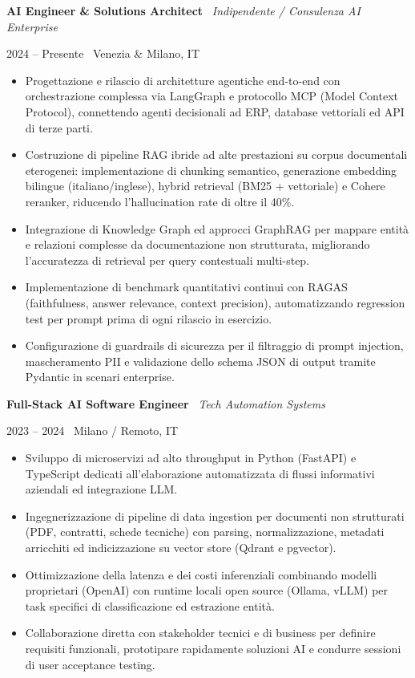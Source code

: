 \documentclass[a4paper,10pt]{article}
\newcommand{\role}[4]{%
  \vspace{2pt}\noindent
  \begin{minipage}[t]{0.70\textwidth}\raggedright\textbf{#1} \textbullet\ \textit{#3}\end{minipage}%
  \hfill
  \begin{minipage}[t]{0.28\textwidth}\raggedleft\footnotesize\color{gray}#2 \textbullet\ #4\end{minipage}%
  \vspace{1pt}%
}
\begin{document}
\role{AI Engineer \& Solutions Architect}{2024 -- Presente}{Indipendente / Consulenza AI Enterprise}{Venezia \& Milano, IT}
\begin{itemize}
  \item Progettazione e rilascio di architetture agentiche end-to-end con orchestrazione complessa via LangGraph e protocollo MCP (Model Context Protocol), connettendo agenti decisionali ad ERP, database vettoriali ed API di terze parti.
  \item Costruzione di pipeline RAG ibride ad alte prestazioni su corpus documentali eterogenei: implementazione di chunking semantico, generazione embedding bilingue (italiano/inglese), hybrid retrieval (BM25 + vettoriale) e Cohere reranker, riducendo l'hallucination rate di oltre il 40\%.
  \item Integrazione di Knowledge Graph ed approcci GraphRAG per mappare entità e relazioni complesse da documentazione non strutturata, migliorando l'accuratezza di retrieval per query contestuali multi-step.
  \item Implementazione di benchmark quantitativi continui con RAGAS (faithfulness, answer relevance, context precision), automatizzando regression test per prompt prima di ogni rilascio in esercizio.
  \item Configurazione di guardrails di sicurezza per il filtraggio di prompt injection, mascheramento PII e validazione dello schema JSON di output tramite Pydantic in scenari enterprise.
\end{itemize}

\vspace{3pt}
\role{Full-Stack AI Software Engineer}{2023 -- 2024}{Tech Automation Systems}{Milano / Remoto, IT}
\begin{itemize}
  \item Sviluppo di microservizi ad alto throughput in Python (FastAPI) e TypeScript dedicati all'elaborazione automatizzata di flussi informativi aziendali ed integrazione LLM.
  \item Ingegnerizzazione di pipeline di data ingestion per documenti non strutturati (PDF, contratti, schede tecniche) con parsing, normalizzazione, metadati arricchiti ed indicizzazione su vector store (Qdrant e pgvector).
  \item Ottimizzazione della latenza e dei costi inferenziali combinando modelli proprietari (OpenAI) con runtime locali open source (Ollama, vLLM) per task specifici di classificazione ed estrazione entità.
  \item Collaborazione diretta con stakeholder tecnici e di business per definire requisiti funzionali, prototipare rapidamente soluzioni AI e condurre sessioni di user acceptance testing.
\end{itemize}
\end{document}
